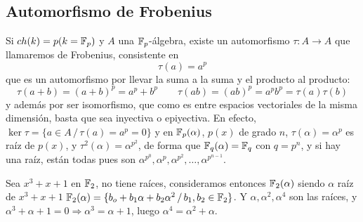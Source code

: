 \subsection{Automorfismo de Frobenius}
Si $ch(k)=p (k = \mathbb{F}_p)$ y $A$ una $\mathbb{F}_p$-\'algebra, existe un automorfismo $\tau: A\longrightarrow A$ que llamaremos de Frobenius, consistente en 
$$\tau(a) = a^p$$
que es un automorfismo por llevar la suma a la suma y el producto al producto:
$$\tau(a+b) = (a+b)^p = a^p + b^p\qquad \tau(ab)= (ab)^p = a^p b^p = \tau(a) \tau(b)$$
y adem\'as por ser isomorfismo, que como es entre espacios vectoriales de la misma dimensi\'on, basta que sea inyectiva o epiyectiva. En efecto, $\ker\tau = \{a\in A\, / \, \tau(a) = a^p =  0\}$ y en $\mathbb{F}_p(\alpha)$, $p(x)$ de grado $n$, $\tau(\alpha)=\alpha^p$ es ra\'iz de $p(x)$, y $\tau^2(\alpha) = \alpha^{p^2}$, de forma que $\mathbb{F}_q(\alpha)=\mathbb{F}_q$ con $q=p^n$, y si hay una ra\'iz, est\'an todas pues son $\alpha^{p^0}, \alpha^p, \alpha^{p^2}, \ldots, \alpha^{p^{n-1}}$. 

\begin{ejem}
    Sea $x^3+x+1$ en $\mathbb{F}_2$, no tiene ra\'ices, consideramos entonces $\mathbb{F}_2 (\alpha)$ siendo $\alpha$ ra\'iz de $x^3+x+1$ $\mathbb{F}_2(\alpha) = \{b_o + b_1 \alpha+b_2 \alpha^2 \, / \, b_1, b_2\in \mathbb{F}_2\}$. Y $\alpha, \alpha^2, \alpha^4$ son las ra\'ices, y $\alpha^3+\alpha+1=0 \Rightarrow \alpha^3=\alpha+1$, luego $\alpha^4=\alpha^2+\alpha$. 
\end{ejem}

